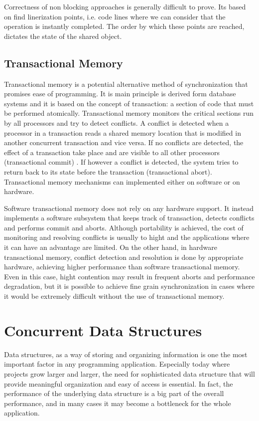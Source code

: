 Correctness of non blocking approaches is  generally difficult to prove. Its based on find linerization points, i.e. code lines where we can consider that the operation is instantly completed. The order by which these points are reached, dictates the state of the shared object.

\subsection{Transactional Memory}

Transactional memory is a potential alternative method of synchronization that promises ease of programming. It is main principle is derived form database systems and it is based on the concept of transaction: a section of code that must be performed atomically. Transactional memory monitors the critical sections run by all processors and try to detect conflicts. A conflict is detected when a processor in a transaction reads a shared memory location that is modified in another concurrent transaction and vice versa. If no conflicts are detected, the effect of a transaction take place and are visible to all other processors (transactional commit) . If however a conflict is detected, the system tries to return back to its state before the transaction (transactional abort). Transactional memory mechanisms can implemented either on software or on hardware.

Software transactional memory does not rely on any hardware support. It instead implements a software subsystem that keeps track of transaction, detects conflicts and performs commit and aborts. Although portability is achieved, the cost of monitoring and resolving conflicts is usually to hight and the applications where it can have an advantage are limited. On the other hand, in hardware transactional memory, conflict detection and resolution is done by appropriate hardware, achieving higher performance than software transactional memory. Even in this case, hight contention may result in frequent aborts and performance degradation, but it is possible to achieve fine grain synchronization in cases where it would be extremely difficult without the use of transactional memory. 

\section{Concurrent Data Structures}

Data structures, as a way of storing and organizing information is one the most important factor in any programming application. Especially today where projects grow larger and larger, the need for sophisticated data structure that will provide meaningful organization and easy of access is essential. In fact, the performance of the underlying data structure is a big part of the overall performance, and in many cases it may become a bottleneck for the whole application.

